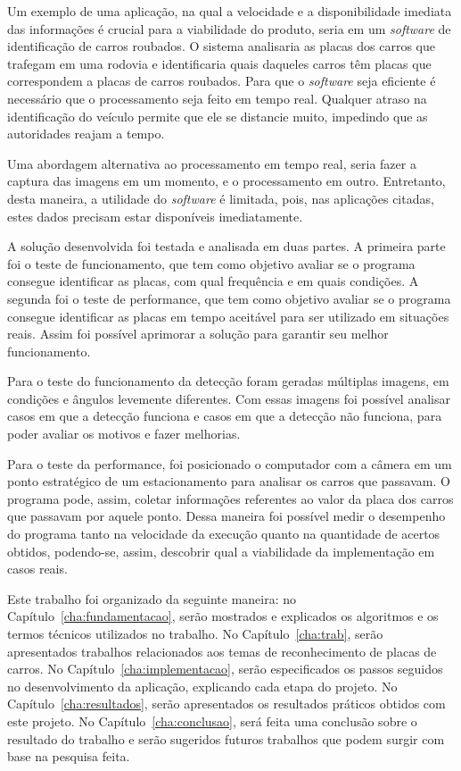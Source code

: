 Um exemplo de uma aplicação, na qual a velocidade e a disponibilidade imediata
das informações é crucial para a viabilidade do produto, seria em um
\emph{software} de identificação de carros roubados. O sistema analisaria as
placas dos carros que trafegam em uma rodovia e identificaria quais daqueles
carros têm placas que correspondem a placas de carros roubados. Para que o
\emph{software} seja eficiente é necessário que o processamento seja feito em
tempo real. Qualquer atraso na identificação do veículo permite que ele se
distancie muito, impedindo que as autoridades reajam a tempo.

Uma abordagem alternativa ao processamento em tempo real, seria fazer a captura
das imagens em um momento, e o processamento em outro. Entretanto, desta
maneira, a utilidade do \emph{software} é limitada, pois, nas aplicações
citadas, estes dados precisam estar disponíveis imediatamente.

A solução desenvolvida foi testada e analisada em duas partes. A primeira parte
foi o teste de funcionamento, que tem como objetivo avaliar se o programa
consegue identificar as placas, com qual frequência e em quais condições. A
segunda foi o teste de performance, que tem como objetivo avaliar se o programa
consegue identificar as placas em tempo aceitável para ser utilizado em
situações reais. Assim foi possível aprimorar a solução para garantir seu melhor
funcionamento.

Para o teste do funcionamento da detecção foram geradas múltiplas imagens, em
condições e ângulos levemente diferentes. Com essas imagens foi possível
analisar casos em que a detecção funciona e casos em que a detecção não
funciona, para poder avaliar os motivos e fazer melhorias.

Para o teste da performance, foi posicionado o computador com a câmera em um
ponto estratégico de um estacionamento para analisar os carros que passavam. O
programa pode, assim, coletar informações referentes ao valor da placa dos
carros que passavam por aquele ponto. Dessa maneira foi possível medir o
desempenho do programa tanto na velocidade da execução quanto na quantidade de
acertos obtidos, podendo-se, assim, descobrir qual a viabilidade da
implementação em casos reais.

Este trabalho foi organizado da seguinte maneira: no
Capítulo~\ref{cha:fundamentacao}, serão mostrados e explicados os algoritmos e
os termos técnicos utilizados no trabalho. No Capítulo~\ref{cha:trab}, serão
apresentados trabalhos relacionados aos temas de reconhecimento de placas de
carros. No Capítulo~\ref{cha:implementacao}, serão especificados os passos
seguidos no desenvolvimento da aplicação, explicando cada etapa do projeto. No
Capítulo~\ref{cha:resultados}, serão apresentados os resultados práticos obtidos
com este projeto. No Capítulo~\ref{cha:conclusao}, será feita uma conclusão
sobre o resultado do trabalho e serão sugeridos futuros trabalhos que podem
surgir com base na pesquisa feita.
